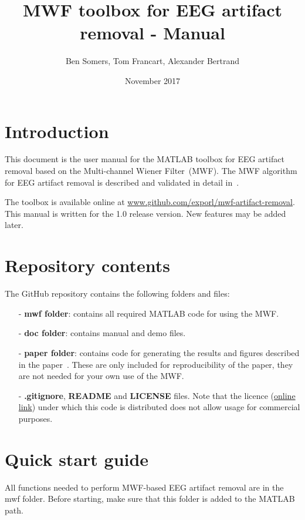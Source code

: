 \documentclass[11pt]{article}
\title{MWF toolbox for EEG artifact removal - Manual}
\author{Ben Somers, Tom Francart, Alexander Bertrand}
\date{November 2017}
\begin{document}
\maketitle
\tableofcontents
\pagebreak

\section{Introduction}

This document is the user manual for the MATLAB toolbox for EEG artifact removal based on the Multi-channel Wiener Filter~(MWF). The MWF algorithm for EEG artifact removal is described and validated in detail in~\cite{somers2018generic}.

The toolbox is available online at \url{www.github.com/exporl/mwf-artifact-removal}. This manual is written for the 1.0 release version. New features may be added later.

\section{Repository contents}

The GitHub repository contains the following folders and files:

\begin{itemize}[noitemsep]
\item[-] \textbf{mwf folder}: contains all required MATLAB code for using the MWF.
\item[-] \textbf{doc folder}: contains manual and demo files.
\item[-] \textbf{paper folder}: contains code for generating the results and figures described in the paper~\cite{somers2018generic}. These are only included for reproducibility of the paper, they are not needed for your own use of the MWF.
\item[-] \textbf{.gitignore}, \textbf{README} and \textbf{LICENSE} files. Note that the licence (\href{www.github.com/exporl/mwf-artifact-removal/blob/master/LICENSE.md}{online link}) under which this code is distributed does not allow usage for commercial purposes.
\end{itemize}

\newpage
\section{Quick start guide}
\label{sec:quickstart}

All functions needed to perform MWF-based EEG artifact removal are in the mwf folder. Before starting, make sure that this folder is added to the MATLAB path.
\end{document}

